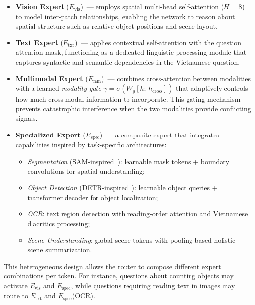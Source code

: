 \begin{itemize}[leftmargin=*,itemsep=2pt]
    \item \textbf{Vision Expert} ($E_{\mathrm{vis}}$)~--- employs spatial multi-head self-attention ($H{=}8$) to model inter-patch relationships, enabling the network to reason about spatial structure such as relative object positions and scene layout.

    \item \textbf{Text Expert} ($E_{\mathrm{txt}}$)~--- applies contextual self-attention with the question attention mask, functioning as a dedicated linguistic processing module that captures syntactic and semantic dependencies in the Vietnamese question.

    \item \textbf{Multimodal Expert} ($E_{\mathrm{mm}}$)~--- combines cross-attention between modalities with a learned \textit{modality gate} $\gamma = \sigma(W_g[h;\, h_{\mathrm{cross}}])$ that adaptively controls how much cross-modal information to incorporate. This gating mechanism prevents catastrophic interference when the two modalities provide conflicting signals.

    \item \textbf{Specialized Expert} ($E_{\mathrm{spec}}$)~--- a composite expert that integrates capabilities inspired by task-specific architectures:
    \begin{itemize}[itemsep=1pt]
        \item \textit{Segmentation} (SAM-inspired~\cite{kirillov2023segment}): learnable mask tokens + boundary convolutions for spatial understanding;
        \item \textit{Object Detection} (DETR-inspired~\cite{carion2020end}): learnable object queries + transformer decoder for object localization;
        \item \textit{OCR}: text region detection with reading-order attention and Vietnamese diacritics processing;
        \item \textit{Scene Understanding}: global scene tokens with pooling-based holistic scene summarization.
    \end{itemize}
\end{itemize}

This heterogeneous design allows the router to compose different expert combinations per token. For instance, questions about counting objects may activate $E_{\mathrm{vis}}$ and $E_{\mathrm{spec}}$, while questions requiring reading text in images may route to $E_{\mathrm{txt}}$ and $E_{\mathrm{spec}}$(OCR).

